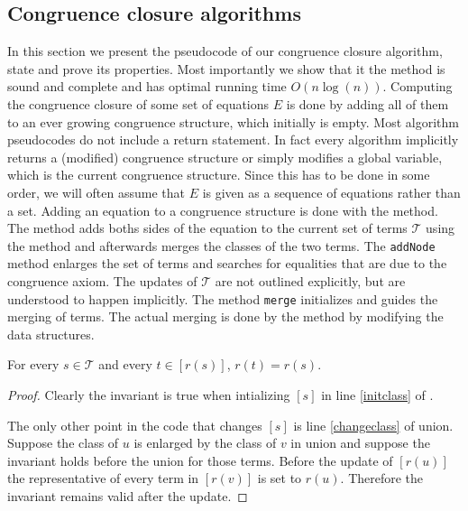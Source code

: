\FloatBarrier

\subsection*{Congruence closure algorithms}

In this section we present the pseudocode of our congruence closure algorithm, state and prove its properties.
Most importantly we show that it the method is sound and complete and has optimal running time $O(n \log(n))$.
Computing the congruence closure of some set of equations $E$ is done by adding all of them to an ever growing congruence structure, which initially is empty.
Most algorithm pseudocodes do not include a return statement.
In fact every algorithm implicitly returns a (modified) congruence structure or simply modifies a global variable, which is the current congruence structure.
Since this has to be done in some order, we will often assume that $E$ is given as a sequence of equations rather than a set.
Adding an equation to a congruence structure is done with the  method.
The method adds boths sides of the equation to the current set of terms $\mathcal{T}$ using the  method and afterwards merges the classes of the two terms.
The \texttt{addNode} method enlarges the set of terms and searches for equalities that are due to the congruence axiom.
The updates of $\mathcal{T}$ are not outlined explicitly, but are understood to happen implicitly.
The method \texttt{merge} initializes and guides the merging of terms.
The actual merging is done by the method  by modifying the data structures.













\begin{invariant}[Class]

For every $s \in \mathcal{T}$ and every $t \in [r(s)]$, $r(t) = r(s)$.

\label{invar:class}
\end{invariant}

\begin{proof}

Clearly the invariant is true when intializing $[s]$ in line \ref{initclass} of .

The only other point in the code that changes $[s]$ is line \ref{changeclass} of union.
Suppose the class of $u$ is enlarged by the class of $v$ in union and suppose the invariant holds before the union for those terms.
Before the update of $[r(u)]$ the representative of every term in $[r(v)]$ is set to $r(u)$.
Therefore the invariant remains valid after the update.

\end{proof}


